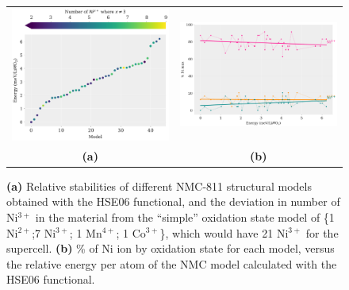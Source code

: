 \documentclass[aps,prb,twocolumn,superscriptaddress,reprint]{revtex4-1}
\begin{document}
\begin{figure}[tb]
  \begin{center}
  \begin{tabular}{c c}
  \includegraphics[width=0.7\columnwidth]{Figures/HSE_energy_cmap.pdf}&\includegraphics[width=0.7\columnwidth]{Figures/Ni_ox_vs_E.pdf}\\
  \textbf{(a)}&\textbf{(b)}\\
   \end{tabular}
    \caption{\label{fig:stability} \textbf{(a)} Relative stabilities of different NMC-811 structural models obtained with the HSE06 functional, and the deviation in number of Ni$^{3+}$ in the material from the ``simple'' oxidation state model of \{1 Ni$^{2+}$;7 Ni$^{3+}$; 1 Mn$^{4+}$; 1 Co$^{3+}$\}, which would have 21 Ni$^{3+}$ for the supercell. \textbf{(b)} \% of Ni ion by oxidation state for each model, versus the relative energy per atom of the NMC model calculated with the HSE06 functional.
    }
    \end{center}
\end{figure}
\end{document}
